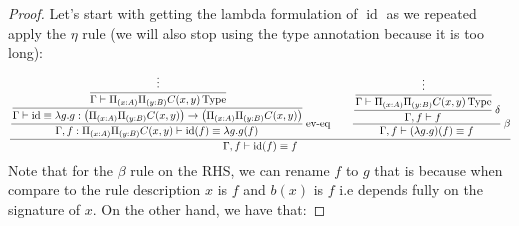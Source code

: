 \begin{proof}
    Let's start with getting the lambda formulation of $\operatorname{id}$ as we repeated apply the $\eta$ rule (we will also stop using the type annotation because it is too long):
    \begin{equation*}
        \cfrac{\cfrac{\cfrac{\cfrac{\vdots}{\Gamma\vdash \Pi_{(x:A)}\Pi_{(y:B)}C(x, y)\operatorname{Type}}}{\Gamma\vdash\operatorname{id}\equiv \lambda g.g:\big( \Pi_{(x:A)}\Pi_{(y:B)}C(x, y)\big)\to\big( \Pi_{(x:A)}\Pi_{(y:B)}C(x, y)\big)}}{\Gamma, f:\Pi_{(x:A)}\Pi_{(y:B)}C(x, y)\vdash\operatorname{id}(f)\equiv \lambda g.g(f)}\text{ ev-eq}\qquad\cfrac{\cfrac{\cfrac{\vdots}{\Gamma\vdash\Pi_{(x:A)}\Pi_{(y:B)}C(x, y)\operatorname{Type}}}{\Gamma, f\vdash f} \ \delta}{\Gamma, f\vdash (\lambda g.g)(f)\equiv f}\ \beta}{\Gamma ,f\vdash\operatorname{id}(f)\equiv f}
    \end{equation*}
    Note that for the $\beta$ rule on the RHS, we can rename $f$ to $g$ that is because when compare to the rule description $x$ is $f$ and $b(x)$ is $f$ i.e depends fully on the signature of $x$. On the other hand, we have that:


\end{proof}
